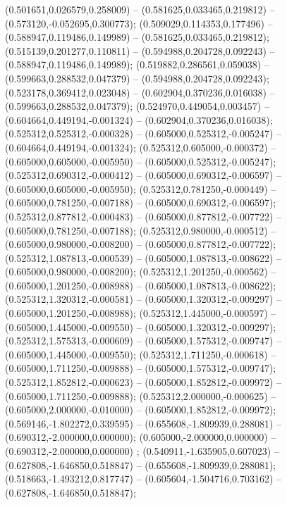  (0.501651,0.026579,0.258009) -- (0.581625,0.033465,0.219812) -- (0.573120,-0.052695,0.300773);
 (0.509029,0.114353,0.177496) -- (0.588947,0.119486,0.149989) -- (0.581625,0.033465,0.219812);
 (0.515139,0.201277,0.110811) -- (0.594988,0.204728,0.092243) -- (0.588947,0.119486,0.149989);
 (0.519882,0.286561,0.059038) -- (0.599663,0.288532,0.047379) -- (0.594988,0.204728,0.092243);
 (0.523178,0.369412,0.023048) -- (0.602904,0.370236,0.016038) -- (0.599663,0.288532,0.047379);
 (0.524970,0.449054,0.003457) -- (0.604664,0.449194,-0.001324) -- (0.602904,0.370236,0.016038);
 (0.525312,0.525312,-0.000328) -- (0.605000,0.525312,-0.005247) -- (0.604664,0.449194,-0.001324);
 (0.525312,0.605000,-0.000372) -- (0.605000,0.605000,-0.005950) -- (0.605000,0.525312,-0.005247);
 (0.525312,0.690312,-0.000412) -- (0.605000,0.690312,-0.006597) -- (0.605000,0.605000,-0.005950);
 (0.525312,0.781250,-0.000449) -- (0.605000,0.781250,-0.007188) -- (0.605000,0.690312,-0.006597);
 (0.525312,0.877812,-0.000483) -- (0.605000,0.877812,-0.007722) -- (0.605000,0.781250,-0.007188);
 (0.525312,0.980000,-0.000512) -- (0.605000,0.980000,-0.008200) -- (0.605000,0.877812,-0.007722);
 (0.525312,1.087813,-0.000539) -- (0.605000,1.087813,-0.008622) -- (0.605000,0.980000,-0.008200);
 (0.525312,1.201250,-0.000562) -- (0.605000,1.201250,-0.008988) -- (0.605000,1.087813,-0.008622);
 (0.525312,1.320312,-0.000581) -- (0.605000,1.320312,-0.009297) -- (0.605000,1.201250,-0.008988);
 (0.525312,1.445000,-0.000597) -- (0.605000,1.445000,-0.009550) -- (0.605000,1.320312,-0.009297);
 (0.525312,1.575313,-0.000609) -- (0.605000,1.575312,-0.009747) -- (0.605000,1.445000,-0.009550);
 (0.525312,1.711250,-0.000618) -- (0.605000,1.711250,-0.009888) -- (0.605000,1.575312,-0.009747);
 (0.525312,1.852812,-0.000623) -- (0.605000,1.852812,-0.009972) -- (0.605000,1.711250,-0.009888);
 (0.525312,2.000000,-0.000625) -- (0.605000,2.000000,-0.010000) -- (0.605000,1.852812,-0.009972);
 (0.569146,-1.802272,0.339595) -- (0.655608,-1.809939,0.288081) -- (0.690312,-2.000000,0.000000);
 (0.605000,-2.000000,0.000000) -- (0.690312,-2.000000,0.000000) ;
 (0.540911,-1.635905,0.607023) -- (0.627808,-1.646850,0.518847) -- (0.655608,-1.809939,0.288081);
 (0.518663,-1.493212,0.817747) -- (0.605604,-1.504716,0.703162) -- (0.627808,-1.646850,0.518847);
